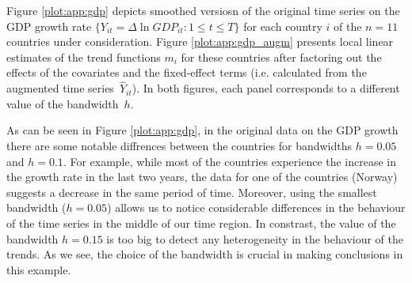 \documentclass[a4paper,12pt]{article}
\begin{document}


Figure \ref{plot:app:gdp} depicts smoothed versiosn of the original time series on the GDP growth rate $\{Y_{it} = \Delta \ln GDP_{it}: 1 \le t \le T\}$ for each country $i$ of the $n=11$ countries under consideration. Figure \ref{plot:app:gdp_augm} presents local linear estimates of the trend functions $m_i$ for these countries after factoring out the effects of the covariates and the fixed-effect terms (i.e. calculated from the augmented time series~$\widehat{Y}_{it}$). In both figures, each panel corresponds to a different value of the bandwidth~$h$.

As can be seen in Figure \ref{plot:app:gdp}, in the original data on the GDP growth there are some notable diffrences between the countries for bandwidths $h = 0.05$ and $h = 0.1$. For example, while most of the countries experience the increase in the growth rate in the last two years, the data for one of the countries (Norway) suggests a decrease in the same period of time. Moreover, using the smallest bandwidth ($h= 0.05$) allows us to notice considerable differences in the behaviour of the time series in the middle of our time region. In constrast, the value of the bandwidth $h = 0.15$ is too big to detect any heterogeneity in the behaviour of the trends. As we see, the choice of the bandwidth is crucial in making conclusions in this example.
\end{document}
